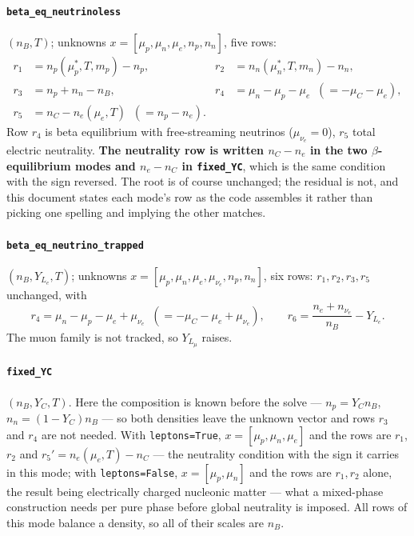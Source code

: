 \documentclass[aps,prc,onecolumn,superscriptaddress,nofootinbib,10pt]{revtex4-2}
\newcommand{\nB}{n_B}
\newcommand{\nC}{n_C}
\newcommand{\muC}{\mu_C}
\newcommand{\munue}{\mu_{\nu_e}}
\newcommand{\mueff}[1]{\mu^{*}_{#1}}
\begin{document}
\paragraph{\texttt{beta\_eq\_neutrinoless}} $(\nB, T)$; unknowns
$x = [\mu_p, \mu_n, \mu_e, n_p, n_n]$, five rows:
%
\begin{equation}
\begin{aligned}
r_1 &= n_p(\mueff{p}, T, m_p) - n_p , \qquad
&r_2 &= n_n(\mueff{n}, T, m_n) - n_n , \\
r_3 &= n_p + n_n - \nB , \qquad
&r_4 &= \mu_n - \mu_p - \mu_e \;\;(= -\muC - \mu_e) , \\
r_5 &= \nC - n_e(\mu_e, T) \;\;(= n_p - n_e) . &&
\end{aligned}
\label{eq:residual_beta}
\end{equation}
%
Row $r_4$ is beta equilibrium with free-streaming neutrinos ($\munue = 0$),
$r_5$ total electric neutrality. \textbf{The neutrality row is written
$\nC - n_e$ in the two $\beta$-equilibrium modes and $n_e - \nC$ in
\texttt{fixed\_YC}}, which is the same condition with the sign reversed. The
root is of course unchanged; the residual is not, and this document states each
mode's row as the code assembles it rather than picking one spelling and
implying the other matches.

\paragraph{\texttt{beta\_eq\_neutrino\_trapped}} $(\nB, Y_{L_e}, T)$; unknowns
$x = [\mu_p, \mu_n, \mu_e, \munue, n_p, n_n]$, six rows: $r_1, r_2, r_3, r_5$
unchanged, with
%
\begin{equation}
r_4 = \mu_n - \mu_p - \mu_e + \munue \;\;(= -\muC - \mu_e + \munue) ,
\qquad
r_6 = \frac{n_e + n_{\nu_e}}{\nB} - Y_{L_e} .
\end{equation}
%
The muon family is not tracked, so $Y_{L_\mu}$ raises.

\paragraph{\texttt{fixed\_YC}} $(\nB, Y_C, T)$. Here the composition is known
before the solve --- $n_p = Y_C \nB$, $n_n = (1 - Y_C)\nB$ --- so both
densities leave the unknown vector and rows $r_3$ and $r_4$ are not needed.
With \texttt{leptons=True}, $x = [\mu_p, \mu_n, \mu_e]$ and the rows are
$r_1$, $r_2$ and $r_5' = n_e(\mu_e, T) - \nC$ --- the neutrality condition
with the sign it carries in this mode; with \texttt{leptons=False},
$x = [\mu_p, \mu_n]$ and the rows are $r_1, r_2$ alone, the result being
electrically charged nucleonic matter --- what a mixed-phase construction
needs per pure phase before global neutrality is imposed. All rows of this
mode balance a density, so all of their scales are $\nB$.
\end{document}
